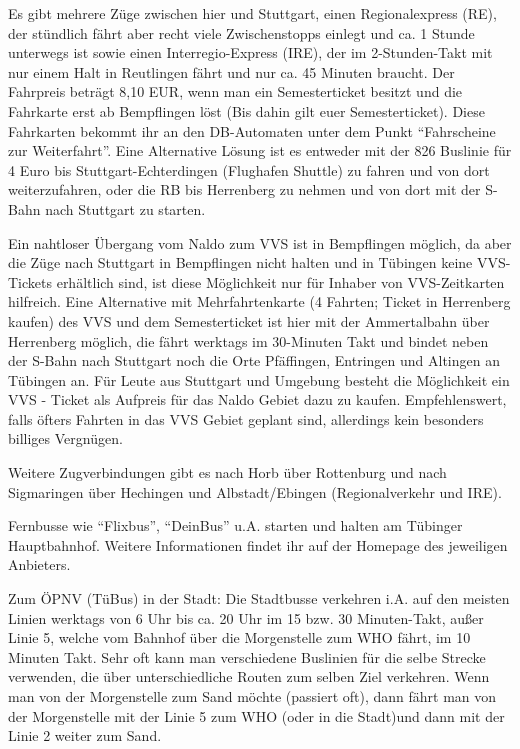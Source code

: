 Es gibt mehrere Züge zwischen hier und Stuttgart, einen
  Regionalexpress (RE), der stündlich fährt aber recht viele
  Zwischenstopps einlegt und ca. 1 Stunde unterwegs ist sowie einen
  Interregio-Express (IRE), der im 2-Stunden-Takt mit nur einem Halt
  in Reutlingen fährt und nur ca. 45 Minuten braucht.
  Der Fahrpreis beträgt 8,10 EUR, wenn man ein Semesterticket
  besitzt und die Fahrkarte erst ab Bempflingen löst (Bis dahin gilt euer Semesterticket).
  Diese Fahrkarten bekommt ihr an den DB-Automaten unter dem Punkt "`Fahrscheine zur Weiterfahrt"'.
Eine Alternative Lösung ist es entweder mit der 826 Buslinie für 4 Euro bis Stuttgart-Echterdingen (Flughafen Shuttle) zu fahren und von dort weiterzufahren, oder die RB bis Herrenberg zu nehmen und von dort mit der S-Bahn nach Stuttgart zu starten.


Ein nahtloser Übergang vom Naldo zum VVS ist in Bempflingen
  möglich, da aber die Züge nach Stuttgart in Bempflingen nicht halten und in
  Tübingen keine VVS-Tickets erhältlich sind, ist diese Möglichkeit nur für
  Inhaber von VVS-Zeitkarten hilfreich. Eine Alternative mit Mehrfahrtenkarte
  (4 Fahrten; Ticket in Herrenberg kaufen) des VVS und dem Semesterticket
  ist hier mit der Ammertalbahn
  über Herrenberg möglich, die fährt werktags im 30-Minuten Takt und
  bindet neben der S-Bahn nach Stuttgart noch die Orte Pfäffingen, Entringen
  und Altingen an Tübingen an. Für Leute aus Stuttgart und Umgebung besteht die Möglichkeit ein VVS - Ticket als Aufpreis für das Naldo Gebiet dazu zu kaufen.
 Empfehlenswert, falls öfters Fahrten in das VVS Gebiet geplant sind, allerdings kein besonders billiges Vergnügen.

Weitere Zugverbindungen gibt es nach Horb über Rottenburg
  und nach Sigmaringen über Hechingen und Albstadt/Ebingen (Regionalverkehr und IRE).

Fernbusse wie "`Flixbus"', "`DeinBus"' u.A. starten und halten am Tübinger Hauptbahnhof. Weitere Informationen findet ihr auf der Homepage
des jeweiligen Anbieters.

Zum ÖPNV (TüBus) in der Stadt: Die Stadtbusse verkehren i.A. auf
  den meisten Linien werktags von 6 Uhr bis ca. 20 Uhr im 15 bzw. 30 Minuten-Takt,
  außer Linie 5, welche vom Bahnhof über die Morgenstelle zum WHO fährt, im 10
  Minuten Takt. Sehr oft kann man verschiedene Buslinien für die selbe Strecke
  verwenden, die über unterschiedliche Routen zum selben Ziel verkehren.
  Wenn man von der Morgenstelle zum Sand möchte (passiert oft), dann
  fährt man von der Morgenstelle mit der Linie 5
  zum WHO (oder in die Stadt)und dann mit der Linie 2 weiter zum Sand.

